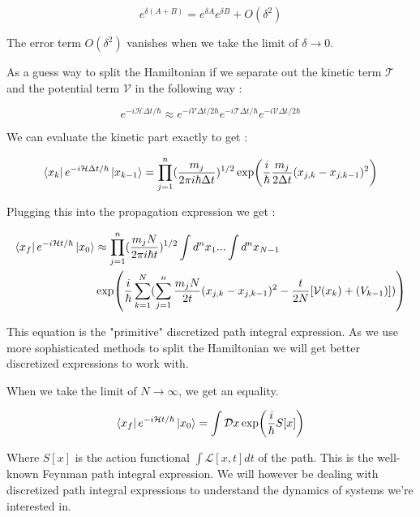 \begin{equation}\label{4.x}
e^{\delta(A + B)} = e^{\delta A}e^{\delta B} + O(\delta^2)
\end{equation}

The error term $O(\delta^2)$ vanishes when we take the limit of $\delta \to 0$.

As a guess way to split the Hamiltonian if we separate out the kinetic term $\mathcal{T}$ and the potential term $\mathcal{V}$ in the following way :

\begin{equation}\label{4.x}
e^{-i\mathcal{H}\Delta t/\hbar} \approx e^{-i\mathcal{V}\Delta t/2\hbar}e^{-i\mathcal{T}\Delta t/\hbar}e^{-i\mathcal{V}\Delta t/2\hbar} 
\end{equation}

We can evaluate the kinetic part exactly to get :

\begin{equation} \label{4.x}
\bra{x_k}e^{-i\mathcal{H} \Delta t/\hbar}\ket{x_{k-1}} = \prod_{j=1}^{n} (\frac{m_j}{2\pi i \hbar \Delta t})^{1/2} \exp(\frac{i}{\hbar} \frac{m_j}{2\Delta t} (x_{j,k} - x_{j, k-1})^2)
\end{equation}

Plugging this into the propagation expression we get :

\begin{equation} \label{4.x}
    \begin{split}
        \bra{x_f} e^{-i\mathcal{H}t/\hbar} \ket{x_0} & \approx \prod_{j=1}^{n} (\frac{m_j N}{2\pi i \hbar t})^{1/2}  \int d^n x_1 ... \int d^n x_{N-1} \\ & \exp(\frac{i}{\hbar} \sum_{k=1}^{N} (\sum_{j=1}^{n} \frac{m_j N}{2t} (x_{j,k} - x_{j, k-1})^2 - \frac{t}{2N}[\mathcal{V}(x_k) + \mathcal(V_{k-1})]))
    \end{split}
\end{equation}

This equation is the "primitive" discretized path integral expression. As we use more sophisticated methods to split the Hamiltonian we will get better discretized expressions to work with.

When we take the limit of $N \to \infty$, we get an equality.  

\begin{equation}
    \bra{x_f} e^{-i\mathcal{H}t/\hbar}\ket{x_0} = \int \mathcal{D}x \exp(\frac{i}{\hbar} S[x])
\end{equation}

Where $S[x]$ is the action functional $\int \mathcal{L}[x, t] dt$ of the path. This is the well-known Feynman path integral expression. \cite{feynhibbs} We will however be dealing with discretized path integral expressions to understand the dynamics of systems we're interested in.

